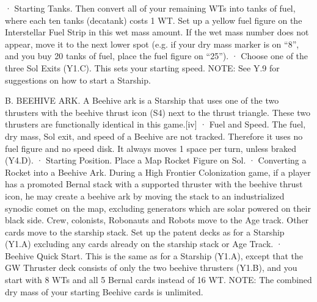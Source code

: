 \documentclass[a4paper]{book}
\begin{document}
·       Starting Tanks. Then convert all of your remaining WTs into tanks of fuel, where each ten tanks (decatank) costs 1 WT. Set up a yellow fuel figure on the Interstellar Fuel Strip in this wet mass amount. If the wet mass number does not appear, move it to the next lower spot (e.g. if your dry mass marker is on “8”, and you buy 20 tanks of fuel, place the fuel figure on “25”).
·       Choose one of the three Sol Exits (Y1.C). This sets your starting speed.
NOTE: See Y.9 for suggestions on how to start a Starship.
 
B. BEEHIVE ARK. A Beehive ark is a Starship that uses one of the two thrusters with the beehive thrust icon (S4) next to the thrust triangle. These two thrusters are functionally identical in this game.[iv]
·       Fuel and Speed. The fuel, dry mass, Sol exit, and speed of a Beehive are not tracked. Therefore it uses no fuel figure and no speed disk. It always moves 1 space per turn, unless braked (Y4.D).
·       Starting Position. Place a Map Rocket Figure on Sol.
·       Converting a Rocket into a Beehive Ark. During a High Frontier Colonization game, if a player has a promoted Bernal stack with a supported thruster with the beehive thrust icon, he may create a beehive ark by moving the stack to an industrialized synodic comet on the map, excluding generators which are solar powered on their black side.  Crew, colonists, Robonauts and Robots move to the Age track. Other cards move to the starship stack. Set up the patent decks as for a Starship (Y1.A) excluding any cards already on the starship stack or Age Track. 
·       Beehive Quick Start. This is the same as for a Starship (Y1.A), except that the GW Thruster deck consists of only the two beehive thrusters (Y1.B), and you start with 8 WTs and all 5 Bernal cards instead of 16 WT.
NOTE: The combined dry mass of your starting Beehive cards is unlimited.
 
\end{document}
